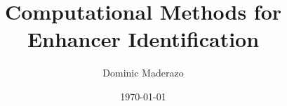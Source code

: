 \documentclass{beamer}
\title[]{Computational Methods for Enhancer Identification}%
\author{Dominic Maderazo} %
{
\medskip
}
\date{\today} %
\begin{document}
    \begin{frame}
        \titlepage 
    \end{frame}
    
        
    
                        
    
\end{document}

